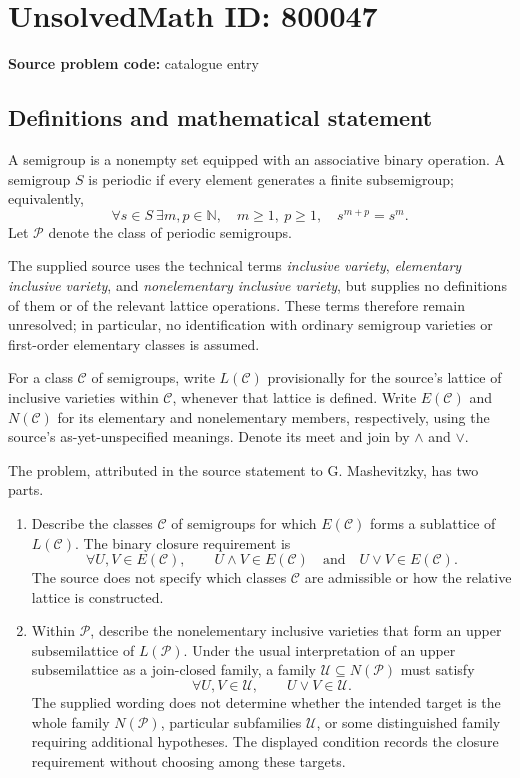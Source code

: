 \documentclass[11pt]{article}
\newcommand{\N}{\mathbb{N}}
\begin{document}
\section*{UnsolvedMath ID: 800047}
\textbf{Source problem code:} catalogue entry
\subsection{Definitions and mathematical statement}
A semigroup is a nonempty set equipped with an associative binary operation. A semigroup \(S\) is periodic if every element generates a finite subsemigroup; equivalently,
\[
\forall s\in S\ \exists m,p\in\N,\quad m\geq 1,\ p\geq 1,\quad s^{m+p}=s^m.
\]
Let \(\mathcal P\) denote the class of periodic semigroups.

The supplied source uses the technical terms \emph{inclusive variety}, \emph{elementary inclusive variety}, and \emph{nonelementary inclusive variety}, but supplies no definitions of them or of the relevant lattice operations. These terms therefore remain unresolved; in particular, no identification with ordinary semigroup varieties or first-order elementary classes is assumed.

For a class \(\mathcal C\) of semigroups, write \(L(\mathcal C)\) provisionally for the source's lattice of inclusive varieties within \(\mathcal C\), whenever that lattice is defined. Write \(E(\mathcal C)\) and \(N(\mathcal C)\) for its elementary and nonelementary members, respectively, using the source's as-yet-unspecified meanings. Denote its meet and join by \(\wedge\) and \(\vee\).

The problem, attributed in the source statement to G. Mashevitzky, has two parts.
\begin{enumerate}
\item Describe the classes \(\mathcal C\) of semigroups for which \(E(\mathcal C)\) forms a sublattice of \(L(\mathcal C)\). The binary closure requirement is
\[
\forall U,V\in E(\mathcal C),\qquad
U\wedge V\in E(\mathcal C)
\quad\text{and}\quad
U\vee V\in E(\mathcal C).
\]
The source does not specify which classes \(\mathcal C\) are admissible or how the relative lattice is constructed.
\item Within \(\mathcal P\), describe the nonelementary inclusive varieties that form an upper subsemilattice of \(L(\mathcal P)\). Under the usual interpretation of an upper subsemilattice as a join-closed family, a family \(\mathcal U\subseteq N(\mathcal P)\) must satisfy
\[
\forall U,V\in\mathcal U,\qquad U\vee V\in\mathcal U.
\]
The supplied wording does not determine whether the intended target is the whole family \(N(\mathcal P)\), particular subfamilies \(\mathcal U\), or some distinguished family requiring additional hypotheses. The displayed condition records the closure requirement without choosing among these targets.
\end{enumerate}
\end{document}
